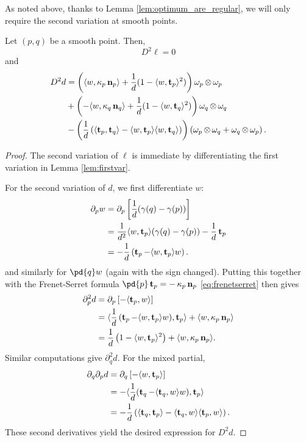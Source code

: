 \documentclass[11pt]{amsart}
\begin{document}
As noted above, thanks to Lemma \ref{lem:optimum_are_regular}, we will only require the second variation at smooth points.

\begin{lemma}
\label{lem:secondvar}
Let \((p,q)\) be a smooth point. Then,
\[
D^2 \ell = 0
\]
and
\[
\begin{split}
D^2d &= \left(\langle{w},{\operatorname{\kappa}_p \operatorname{\mathbf{n}}_p}\rangle + \frac{1}{d}(1 - \langle{w},{\operatorname{\mathbf{t}}_p}\rangle^2) \right) \omega_p \operatorname{\otimes} \omega_p \\
&+ \left(-\langle{w},{\operatorname{\kappa}_q \operatorname{\mathbf{n}}_q}\rangle + \frac{1}{d}(1 - \langle{w},{\operatorname{\mathbf{t}}_q}\rangle^2) \right) \omega_q \operatorname{\otimes} \omega_q \\
&- \left(\frac{1}{d}\left(\langle{\operatorname{\mathbf{t}}_p},{\operatorname{\mathbf{t}}_q}\rangle - \langle{w},{\operatorname{\mathbf{t}}_p}\rangle\langle{w},{\operatorname{\mathbf{t}}_q}\rangle\right) \right) \left(\omega_p \operatorname{\otimes} \omega_q + \omega_q \operatorname{\otimes} \omega_p\right).
\end{split}
\]
\end{lemma}

\begin{proof}
The second variation of \(\ell\) is immediate by differentiating the first variation in Lemma \ref{lem:firstvar}.

For the second variation of \(d\), we first differentiate $w$:
\[
\begin{split}
\partial_p w &= \partial_p \left[\frac{1}{d} (\gamma(q) - \gamma(p))\right] \\
&= \frac{1}{d^2} \langle{w},{\operatorname{\mathbf{t}}_p}\rangle (\gamma(q) - \gamma(p)) - \frac{1}{d} \operatorname{\mathbf{t}}_p \\
&= -\frac{1}{d}\left(\operatorname{\mathbf{t}}_p - \langle{w},{\operatorname{\mathbf{t}}_p}\rangle w\right).
\end{split}
\]
and similarly for $\pd{q} w$ (again with the sign changed).  Putting this together with the Frenet-Serret formula $\pd{p} \tang_p = -\curvecurv_p \nor_p$ \eqref{eq:frenetserret} then gives
\[
\begin{split}
\partial_p^2 d &= \partial_p \left[-\langle{\operatorname{\mathbf{t}}_p},{w}\rangle\right] \\
&= \langle{\frac{1}{d}\left(\operatorname{\mathbf{t}}_p - \ensuremath{\langle{w},{\operatorname{\mathbf{t}}_p}\rangle} w\right)},{\operatorname{\mathbf{t}}_p}\rangle + \langle{w},{\operatorname{\kappa}_p \operatorname{\mathbf{n}}_p}\rangle \\
&= \frac{1}{d}\left(1 - \langle{w},{\operatorname{\mathbf{t}}_p}\rangle^2\right) + \langle{w},{\operatorname{\kappa}_p \operatorname{\mathbf{n}}_p}\rangle.
\end{split}
\]
Similar computations give $\partial_q^2 d$. For the mixed partial,
\[
\begin{split}
\partial_q \partial_p d &= \partial_q \left[-\langle{w},{\operatorname{\mathbf{t}}_p}\rangle\right] \\
&= -\langle{\frac{1}{d}(\operatorname{\mathbf{t}}_q - \ensuremath{\langle{\operatorname{\mathbf{t}}_q},{w}\rangle}w)},{\operatorname{\mathbf{t}}_p}\rangle \\
&= - \frac{1}{d} \left(\langle{\operatorname{\mathbf{t}}_q},{\operatorname{\mathbf{t}}_p}\rangle - \langle{\operatorname{\mathbf{t}}_q},{w}\rangle\langle{\operatorname{\mathbf{t}}_p},{w}\rangle\right).
\end{split}
\]
These second derivatives yield the desired expression for \(D^2 d\).
\end{proof}
\end{document}
